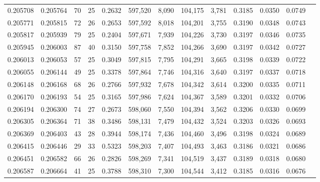 \begin{tabular}{rrrrrrrrrrrrr}
0.205708 & 0.205764 &    70 &  25 &                                     0.2632 & 597,520 &   8,090 & 104,175 &   3,781 & 0.3185 & 0.0350 & 0.0749 \\
0.205771 & 0.205815 &    72 &  26 &                                     0.2653 & 597,592 &   8,018 & 104,201 &   3,755 & 0.3190 & 0.0348 & 0.0743 \\
0.205817 & 0.205939 &    79 &  25 &                                     0.2404 & 597,671 &   7,939 & 104,226 &   3,730 & 0.3197 & 0.0346 & 0.0735 \\
0.205945 & 0.206003 &    87 &  40 &                                     0.3150 & 597,758 &   7,852 & 104,266 &   3,690 & 0.3197 & 0.0342 & 0.0727 \\
0.206013 & 0.206053 &    57 &  25 &                                     0.3049 & 597,815 &   7,795 & 104,291 &   3,665 & 0.3198 & 0.0339 & 0.0722 \\
0.206055 & 0.206144 &    49 &  25 &                                     0.3378 & 597,864 &   7,746 & 104,316 &   3,640 & 0.3197 & 0.0337 & 0.0718 \\
0.206148 & 0.206168 &    68 &  26 &                                     0.2766 & 597,932 &   7,678 & 104,342 &   3,614 & 0.3200 & 0.0335 & 0.0711 \\
0.206170 & 0.206193 &    54 &  25 &                                     0.3165 & 597,986 &   7,624 & 104,367 &   3,589 & 0.3201 & 0.0332 & 0.0706 \\
0.206194 & 0.206300 &    74 &  27 &                                     0.2673 & 598,060 &   7,550 & 104,394 &   3,562 & 0.3206 & 0.0330 & 0.0699 \\
0.206305 & 0.206364 &    71 &  38 &                                     0.3486 & 598,131 &   7,479 & 104,432 &   3,524 & 0.3203 & 0.0326 & 0.0693 \\
0.206369 & 0.206403 &    43 &  28 &                                     0.3944 & 598,174 &   7,436 & 104,460 &   3,496 & 0.3198 & 0.0324 & 0.0689 \\
0.206415 & 0.206446 &    29 &  33 &                                     0.5323 & 598,203 &   7,407 & 104,493 &   3,463 & 0.3186 & 0.0321 & 0.0686 \\
0.206451 & 0.206582 &    66 &  26 &                                     0.2826 & 598,269 &   7,341 & 104,519 &   3,437 & 0.3189 & 0.0318 & 0.0680 \\
0.206587 & 0.206664 &    41 &  25 &                                     0.3788 & 598,310 &   7,300 & 104,544 &   3,412 & 0.3185 & 0.0316 & 0.0676 \\

\end{tabular}
